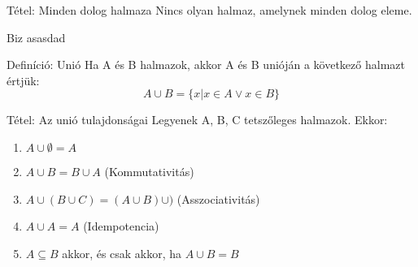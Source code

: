 \documentclass{beamer}
\begin{document}
\begin{frame}[plain]
\end{frame}

\begin{frame}[plain]
\end{frame}


\begin{frame}

\begin{block}{Tétel: Minden dolog halmaza}
Nincs olyan halmaz, amelynek minden dolog eleme.
\end{block}

\begin{block}{Biz}
asasdad
\end{block}

\end{frame}

\begin{frame}

\begin{block}{Definíció: Unió}
Ha A és B halmazok, akkor A és B unióján a következő halmazt értjük:\\
$$A \cup B = \{x | x \in A \vee x \in B\}$$
\end{block}

\begin{block}{Tétel: Az unió tulajdonságai}
Legyenek A, B, C tetszőleges halmazok. Ekkor:

\begin{enumerate}
\item $A \cup \emptyset = A$
\item $A \cup B = B \cup A$ (Kommutativitás)
\item $A \cup (B \cup C) = (A \cup B) \cup )$ (Asszociativitás)
\item $A \cup A = A$ (Idempotencia)
\item $A \subseteq B$ akkor, és csak akkor, ha $A \cup B = B$
\end{enumerate}

\end{block}

\end{frame}
\end{document}
